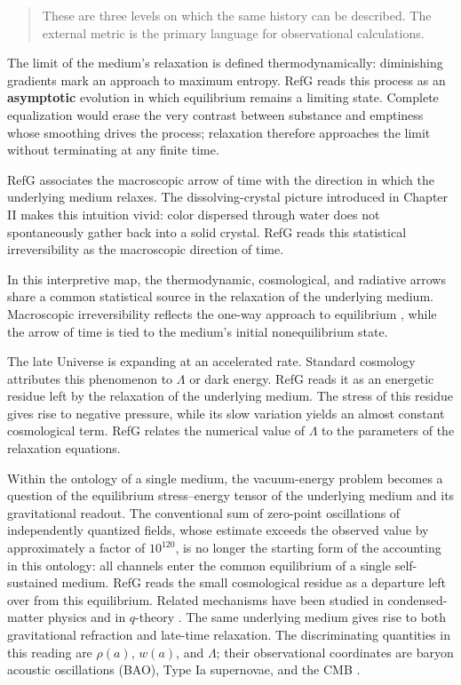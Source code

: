 \documentclass[11pt,a4paper]{article}
\begin{document}
\begin{quote}
These are three levels on which the same history can be described. The external metric is the primary language for observational calculations.
\end{quote}

The limit of the medium's relaxation is defined thermodynamically: diminishing gradients mark an approach to maximum entropy. RefG reads this process as an \textbf{asymptotic} evolution in which equilibrium remains a limiting state. Complete equalization would erase the very contrast between substance and emptiness whose smoothing drives the process; relaxation therefore approaches the limit without terminating at any finite time.

RefG associates the macroscopic arrow of time with the direction in which the underlying medium relaxes. The dissolving-crystal picture introduced in Chapter II makes this intuition vivid: color dispersed through water does not spontaneously gather back into a solid crystal. RefG reads this statistical irreversibility as the macroscopic direction of time.

In this interpretive map, the thermodynamic, cosmological, and radiative arrows share a common statistical source in the relaxation of the underlying medium. Macroscopic irreversibility reflects the one-way approach to equilibrium \citep{planck1899}, while the arrow of time is tied to the medium's initial nonequilibrium state.

The late Universe is expanding at an accelerated rate. Standard cosmology attributes this phenomenon to $\Lambda$ or dark energy. RefG reads it as an energetic residue left by the relaxation of the underlying medium. The stress of this residue gives rise to negative pressure, while its slow variation yields an almost constant cosmological term. RefG relates the numerical value of $\Lambda$ to the parameters of the relaxation equations.

Within the ontology of a single medium, the vacuum-energy problem becomes a question of the equilibrium stress--energy tensor of the underlying medium and its gravitational readout. The conventional sum of zero-point oscillations of independently quantized fields, whose estimate exceeds the observed value by approximately a factor of $10^{120}$, is no longer the starting form of the accounting in this ontology: all channels enter the common equilibrium of a single self-sustained medium. RefG reads the small cosmological residue as a departure left over from this equilibrium. Related mechanisms have been studied in condensed-matter physics and in $q$-theory \citep{volovik2003,klinkhamer2008}. The same underlying medium gives rise to both gravitational refraction and late-time relaxation. The discriminating quantities in this reading are $\rho(a)$, $w(a)$, and $\Lambda$; their observational coordinates are baryon acoustic oscillations (BAO), Type Ia supernovae, and the CMB \citep{abdulkarim2025,brout2022,planck2020}.
\end{document}
